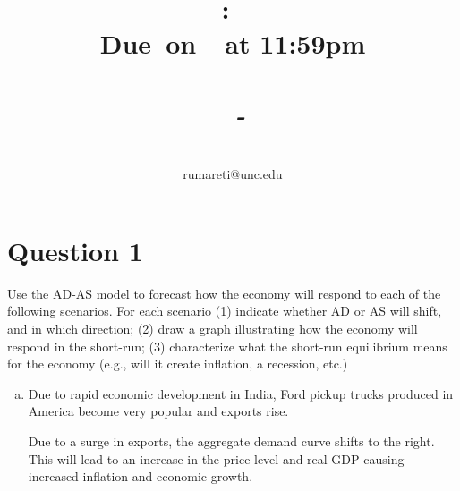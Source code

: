 \documentclass{article}
\title{
    \vspace{2in}
    \textmd{\textbf{\hmwkClass:\ \hmwkTitle}}\\
    \normalsize\vspace{0.1in}\small{\textbf{Due\ on\ \hmwkDueDate\ at 11:59pm}}\\
    \normalsize\text{Tuesday/Thursday 3:30-4:45, Genome Sciences 100}\\
    \vspace{0.1in}\large{\textit{\hmwkClassInstructor\ - \hmwkClassTime}}
    \vspace{3in}
}
\author{\hmwkAuthorName\\\small{rumareti@unc.edu}}
\date{}
\newcommand{\question}[1]{\pagebreak\section{Question #1}}
\begin{document}
\maketitle

\question{1}

Use the AD-AS model to forecast how the economy will respond to
each of the following scenarios. For each scenario (1) indicate whether
AD or AS will shift, and in which direction; (2) draw a graph illustrating how the economy will respond in the short-run; (3) characterize
what the short-run equilibrium means for the economy (e.g., will it
create inflation, a recession, etc.)

\begin{enumerate}[(a)]
    \item Due to rapid economic development in India, Ford pickup trucks produced in America become very popular and exports rise.
    

    Due to a surge in exports, the aggregate demand curve shifts to the right. This will lead to an increase in the price level and real GDP causing increased inflation and economic growth.


\end{enumerate}
\end{document}
